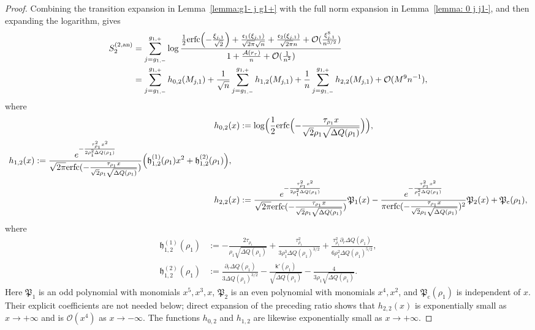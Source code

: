 \documentclass[a4paper]{article}
\numberwithin{equation}{section}
\begin{document}
\begin{proof}
Combining the transition expansion in Lemma~\ref{lemma:g1- j g1+} with the full norm expansion in Lemma~\ref{lemma: 0 j j1-}, and then expanding the logarithm, gives
\begin{align*}
S_2^{(2,\mathrm{an})}
&=
 \sum_{j=g_{1,-}}^{g_{1,+}}\log\frac{\frac{1}{2}\mathrm{erfc}\Bigl( -\frac{\xi_{j,1}}{\sqrt{2}}\Bigr)
+\frac{\mathfrak{c}_1(\xi_{j,1})}{\sqrt{2\pi}\sqrt{n}}+\frac{\mathfrak{c}_2(\xi_{j,1})}{\sqrt{2\pi}n}+\mathcal{O}(\frac{\xi_{j,1}^8}{n^{3/2}})}{1+\frac{\mathcal{A}(r_{\tau})}{n}+\mathcal{O}(\frac{1}{n^2})}
\\
&=
\sum_{j=g_{1,-}}^{g_{1,+}}
h_{0,2}(M_{j,1})
+
\frac{1}{\sqrt{n}}
\sum_{j=g_{1,-}}^{g_{1,+}}
h_{1,2}(M_{j,1})
+
\frac{1}{n}
\sum_{j=g_{1,-}}^{g_{1,+}}
h_{2,2}(M_{j,1})
+
\mathcal{O}(M^{9}n^{-1}),
\end{align*}
where 
\begin{align}
h_{0,2}(x)&:=
\log\Bigl( 
\frac{1}{2}\mathrm{erfc}\Bigl(-\frac{\tau_{\rho_1}x}{\sqrt{2}\rho_1\sqrt{\Delta Q(\rho_1)}}\Bigr)
\Bigr),   
\\
\begin{split}
h_{1,2}(x)&:=
\frac{e^{-\frac{\tau_{\rho_1}^2x^2}{2\rho_1^2\Delta Q(\rho_1)}}}{\sqrt{2\pi}\mathrm{erfc}(-\frac{\tau_{\rho_1}x}{\sqrt{2}\rho_1\sqrt{\Delta Q(\rho_1)}})}
\Bigl(
\mathfrak{h}_{1,2}^{(1)}(\rho_1)x^2
+\mathfrak{h}_{1,2}^{(2)}(\rho_1)
\Bigr),
\end{split}
\\
h_{2,2}(x)&:=
\frac{e^{-\frac{\tau_{\rho_1}^2x^2}{2\rho_1^2\Delta Q(\rho_1)}}}{\sqrt{2\pi}\mathrm{erfc}(-\frac{\tau_{\rho_1}x}{\sqrt{2}\rho_1\sqrt{\Delta Q(\rho_1)}})}\mathfrak{P}_1(x)
-
\frac{e^{-\frac{\tau_{\rho_1}^2x^2}{\rho_1^2\Delta Q(\rho_1)}}}{\pi\mathrm{erfc}(-\frac{\tau_{\rho_1}x}{\sqrt{2}\rho_1\sqrt{\Delta Q(\rho_1)}})^2}\mathfrak{P}_2(x)
+
\mathfrak{P}_{\mathrm{c}}(\rho_1),
\end{align}
where 
\begin{align}
\mathfrak{h}_{1,2}^{(1)}(\rho_1)&:=-\frac{2\tau_{\rho_1}}{\rho_1\sqrt{\Delta Q(\rho_1)}}
+\frac{\tau_{\rho_1}^2}{3\rho_1^3\Delta Q(\rho_1)^{3/2}}
+\frac{\tau_{\rho_1}^2\partial_r\Delta Q(\rho_1)}{6\rho_1^2\Delta Q(\rho_1)^{5/2}},
\\
\mathfrak{h}_{1,2}^{(2)}(\rho_1)&:=\frac{\partial_r\Delta Q(\rho_1)}{3\Delta Q(\rho_1)^{3/2}}-\frac{\mathsf{k}'(\rho_1)}{\sqrt{\Delta Q(\rho_1)}}-\frac{4}{3\rho_1\sqrt{\Delta Q(\rho_1)}}.
\end{align}
Here $\mathfrak P_1$ is an odd polynomial with monomials $x^5,x^3,x$, $\mathfrak P_2$ is an even polynomial with monomials $x^4,x^2$, and $\mathfrak P_{\mathrm c}(\rho_1)$ is independent of $x$. Their explicit coefficients are not needed below; direct expansion of the preceding ratio shows that $h_{2,2}(x)$ is exponentially small as $x\to+\infty$ and is $\mathcal O(x^4)$ as $x\to-\infty$. The functions $h_{0,2}$ and $h_{1,2}$ are likewise exponentially small as $x\to+\infty$.


\end{proof}
\end{document}

